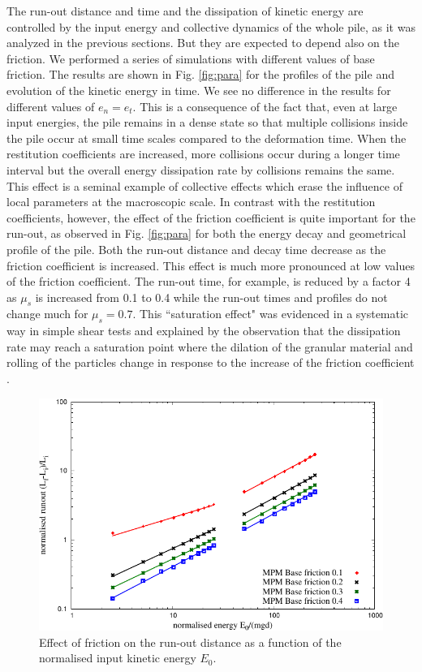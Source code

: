 The run-out distance and time and the dissipation of kinetic energy are 
controlled by the input energy and collective dynamics of the whole pile, as it 
was analyzed in the previous sections. But they are expected to depend also on 
the friction. We performed a series of simulations with different values of 
base friction. The results are shown in Fig. \ref{fig:para} for the profiles of 
the pile and evolution of the kinetic energy in time. We see no difference in 
the results for different values of $e_n = e_t$. This is a consequence of the 
fact that,  even at large input energies, the pile remains in a dense state so 
that multiple collisions inside the pile occur at small time scales compared to 
the deformation time. When the restitution coefficients are increased, more 
collisions occur during a longer time interval but the overall energy 
dissipation rate by collisions remains the same. This effect is a seminal 
example of collective effects which erase the influence of local parameters at 
the macroscopic scale. In contrast with the restitution coefficients, however, 
the effect of the friction coefficient is quite important for the run-out, as 
observed in Fig. \ref{fig:para} for both the energy decay and geometrical 
profile of the pile. Both the run-out distance and decay time decrease as the 
friction coefficient is increased. This effect is much more pronounced at low 
values of the friction coefficient. The run-out time, for example, is reduced by 
a factor 4 as $\mu_s$ is increased from 0.1 to 0.4 while the run-out times and 
profiles do not change much for $\mu_s = 0.7$. This ``saturation effect" was 
evidenced in a systematic way in simple shear tests and explained by the 
observation that the dissipation rate may reach a saturation point where the 
dilation of the granular material and rolling of the particles change in 
response to the increase of the friction coefficient \cite{Estrada2008}.

\begin{figure}[tbhp]
\centering
\includegraphics[width=\textwidth]{runout_fric_slope}
\caption{Effect of friction on the run-out distance as a function of the 
normalised input kinetic energy $E_{0}$.}
\label{fig:runout_fric_slope}
\end{figure}


